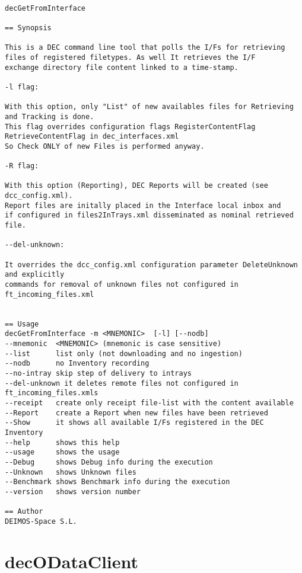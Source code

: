 \documentclass[dec_sum_main.tex]{subfiles}
\begin{document}
\begin{verbatim}

decGetFromInterface 

== Synopsis

This is a DEC command line tool that polls the I/Fs for retrieving 
files of registered filetypes. As well It retrieves the I/F 
exchange directory file content linked to a time-stamp.

-l flag:

With this option, only "List" of new availables files for Retrieving and Tracking is done.
This flag overrides configuration flags RegisterContentFlag RetrieveContentFlag in dec_interfaces.xml
So Check ONLY of new Files is performed anyway.

-R flag:

With this option (Reporting), DEC Reports will be created (see dcc_config.xml). 
Report files are initally placed in the Interface local inbox and
if configured in files2InTrays.xml disseminated as nominal retrieved file.

--del-unknown:

It overrides the dcc_config.xml configuration parameter DeleteUnknown and explicitly
commands for removal of unknown files not configured in ft_incoming_files.xml


== Usage
decGetFromInterface -m <MNEMONIC>  [-l] [--nodb]
--mnemonic  <MNEMONIC> (mnemonic is case sensitive)
--list      list only (not downloading and no ingestion)
--nodb      no Inventory recording
--no-intray skip step of delivery to intrays
--del-unknown it deletes remote files not configured in ft_incoming_files.xmls
--receipt   create only receipt file-list with the content available
--Report    create a Report when new files have been retrieved
--Show      it shows all available I/Fs registered in the DEC Inventory
--help      shows this help
--usage     shows the usage
--Debug     shows Debug info during the execution
--Unknown   shows Unknown files
--Benchmark shows Benchmark info during the execution
--version   shows version number

== Author
DEIMOS-Space S.L.

\end{verbatim}


\section{decODataClient}
\label{decODataClient}
\end{document}
